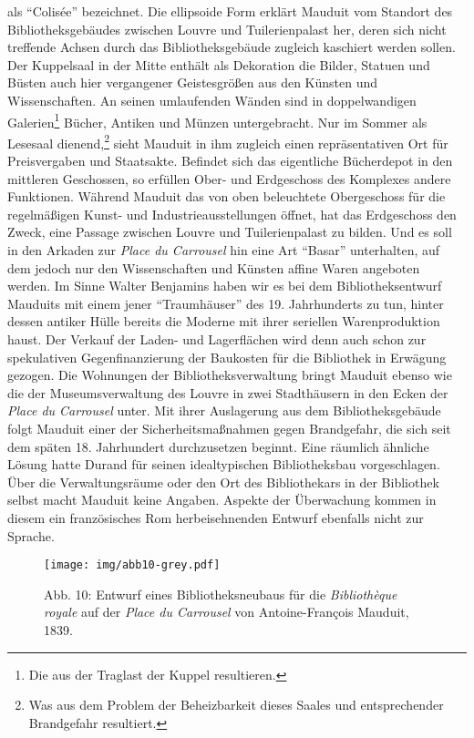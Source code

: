 als \enquote{Colisée} bezeichnet. Die ellipsoide Form erklärt Mauduit
vom Standort des Bibliotheksgebäudes zwischen Louvre und Tuilerienpalast
her, deren sich nicht treffende Achsen durch das Bibliotheksgebäude
zugleich kaschiert werden sollen. Der Kuppelsaal in der Mitte enthält
als Dekoration die Bilder, Statuen und Büsten auch hier vergangener
Geistesgrößen aus den Künsten und Wissenschaften. An seinen umlaufenden
Wänden sind in doppelwandigen Galerien\footnote{Die aus der Traglast der
  Kuppel resultieren.} Bücher, Antiken und Münzen untergebracht. Nur im
Sommer als Lesesaal dienend,\footnote{Was aus dem Problem der
  Beheizbarkeit dieses Saales und entsprechender Brandgefahr resultiert.}
sieht Mauduit in ihm zugleich einen repräsentativen Ort für
Preisvergaben und Staatsakte. Befindet sich das eigentliche Bücherdepot
in den mittleren Geschossen, so erfüllen Ober- und Erdgeschoss des
Komplexes andere Funktionen. Während Mauduit das von oben beleuchtete
Obergeschoss für die regelmäßigen Kunst- und Industrieausstellungen
öffnet, hat das Erdgeschoss den Zweck, eine Passage zwischen Louvre und
Tuilerienpalast zu bilden. Und es soll in den Arkaden zur \emph{Place du
Carrousel} hin eine Art \enquote{Basar} unterhalten, auf dem jedoch nur
den Wissenschaften und Künsten affine Waren angeboten werden. Im Sinne
Walter Benjamins haben wir es bei dem Bibliotheksentwurf Mauduits mit
einem jener \enquote{Traumhäuser} des 19. Jahrhunderts zu tun, hinter
dessen antiker Hülle bereits die Moderne mit ihrer seriellen
Warenproduktion haust. Der Verkauf der Laden- und Lagerflächen wird denn
auch schon zur spekulativen Gegenfinanzierung der Baukosten für die
Bibliothek in Erwägung gezogen. Die Wohnungen der Bibliotheksverwaltung
bringt Mauduit ebenso wie die der Museumsverwaltung des Louvre in zwei
Stadthäusern in den Ecken der \emph{Place du Carrousel} unter. Mit ihrer
Auslagerung aus dem Bibliotheksgebäude folgt Mauduit einer der
Sicherheitsmaßnahmen gegen Brandgefahr, die sich seit dem späten 18.
Jahrhundert durchzusetzen beginnt. Eine räumlich ähnliche Lösung hatte
Durand für seinen idealtypischen Bibliotheksbau vorgeschlagen. Über die
Verwaltungsräume oder den Ort des Bibliothekars in der Bibliothek selbst
macht Mauduit keine Angaben. Aspekte der Überwachung kommen in diesem
ein französisches Rom herbeisehnenden Entwurf ebenfalls nicht zur
Sprache.

\begin{figure}[htbp]
\centering
\texttt{[image: img/abb10-grey.pdf]}
\caption*{Abb. 10: Entwurf eines Bibliotheksneubaus für die
\emph{Bibliothèque royale} auf der \emph{Place du Carrousel} von
Antoine-François Mauduit, 1839.}
\end{figure}

